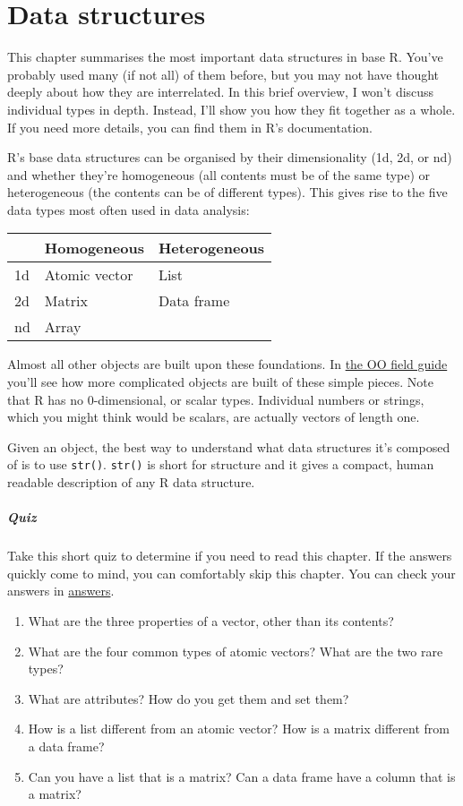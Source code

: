 \hypertarget{data-structures}{%
\chapter{Data structures}\label{data-structures}}

This chapter summarises the most important data structures in base R.
You've probably used many (if not all) of them before, but you may not
have thought deeply about how they are interrelated. In this brief
overview, I won't discuss individual types in depth. Instead, I'll show
you how they fit together as a whole. If you need more details, you can
find them in R's documentation.

R's base data structures can be organised by their dimensionality (1d,
2d, or nd) and whether they're homogeneous (all contents must be of the
same type) or heterogeneous (the contents can be of different types).
This gives rise to the five data types most often used in data analysis:

\begin{longtable}[]{@{}lll@{}}
\toprule
& Homogeneous & Heterogeneous\tabularnewline
\midrule
\endhead
1d & Atomic vector & List\tabularnewline
2d & Matrix & Data frame\tabularnewline
nd & Array &\tabularnewline
\bottomrule
\end{longtable}

Almost all other objects are built upon these foundations. In
\protect\hyperlink{oo}{the OO field guide} you'll see how more
complicated objects are built of these simple pieces. Note that R has no
0-dimensional, or scalar types. Individual numbers or strings, which you
might think would be scalars, are actually vectors of length one.

Given an object, the best way to understand what data structures it's
composed of is to use \texttt{str()}. \texttt{str()} is short for
structure and it gives a compact, human readable description of any R
data structure. 

\hypertarget{quiz}{%
\paragraph{Quiz}\label{quiz}}

Take this short quiz to determine if you need to read this chapter. If
the answers quickly come to mind, you can comfortably skip this chapter.
You can check your answers in
\protect\hyperlink{data-structure-answers}{answers}.

\begin{enumerate}
\def\labelenumi{\arabic{enumi}.}
\item
  What are the three properties of a vector, other than its contents?
\item
  What are the four common types of atomic vectors? What are the two
  rare types?
\item
  What are attributes? How do you get them and set them?
\item
  How is a list different from an atomic vector? How is a matrix
  different from a data frame?
\item
  Can you have a list that is a matrix? Can a data frame have a column
  that is a matrix?
\end{enumerate}

